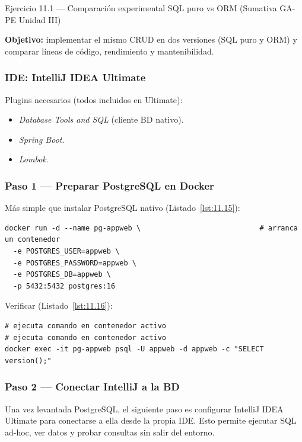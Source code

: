 \documentclass[11pt,a4paper,openany]{book}
\begin{document}
\begin{cajaejercicio}{Ejercicio 11.1 --- Comparación experimental SQL puro vs ORM (Sumativa GA-PE Unidad III)}

\textbf{Objetivo:} implementar el mismo CRUD en dos versiones (SQL
puro y ORM) y comparar líneas de código, rendimiento y mantenibilidad.

\subsubsection*{IDE: IntelliJ IDEA Ultimate}
Plugins necesarios (todos incluidos en Ultimate):
\begin{itemize}
\item \emph{Database Tools and SQL} (cliente BD nativo).
\item \emph{Spring Boot}.
\item \emph{Lombok}.
\end{itemize}

\subsubsection*{Paso 1 --- Preparar PostgreSQL en Docker}

Más simple que instalar PostgreSQL nativo (Listado~\ref{lst:11.15}):
\begin{lstlisting}[style=shell,numbers=none,caption={Ejemplo de Shell},label=lst:11.15]
docker run -d --name pg-appweb \                            # arranca un contenedor
  -e POSTGRES_USER=appweb \
  -e POSTGRES_PASSWORD=appweb \
  -e POSTGRES_DB=appweb \
  -p 5432:5432 postgres:16
\end{lstlisting}

Verificar (Listado~\ref{lst:11.16}):
\begin{lstlisting}[style=shell,numbers=none,caption={Ejemplo de Shell},label=lst:11.16]
# ejecuta comando en contenedor activo
# ejecuta comando en contenedor activo
docker exec -it pg-appweb psql -U appweb -d appweb -c "SELECT version();"
\end{lstlisting}

\subsubsection*{Paso 2 --- Conectar IntelliJ a la BD}

Una vez levantada PostgreSQL, el siguiente paso es configurar
IntelliJ IDEA Ultimate para conectarse a ella desde la propia IDE.
Esto permite ejecutar SQL ad-hoc, ver datos y probar consultas sin
salir del entorno.



\end{cajaejercicio}
\end{document}
